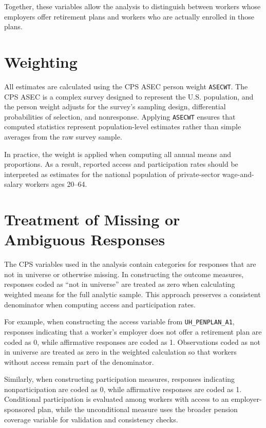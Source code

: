 \documentclass[11pt]{article}
\begin{document}
Together, these variables allow the analysis to distinguish between workers whose employers offer retirement plans and workers who are actually enrolled in those plans.

\section{Weighting}

All estimates are calculated using the CPS ASEC person weight \texttt{ASECWT}. The CPS ASEC is a complex survey designed to represent the U.S. population, and the person weight adjusts for the survey's sampling design, differential probabilities of selection, and nonresponse. Applying \texttt{ASECWT} ensures that computed statistics represent population-level estimates rather than simple averages from the raw survey sample.

In practice, the weight is applied when computing all annual means and proportions. As a result, reported access and participation rates should be interpreted as estimates for the national population of private-sector wage-and-salary workers ages 20--64.

\section{Treatment of Missing or Ambiguous Responses}

The CPS variables used in the analysis contain categories for responses that are not in universe or otherwise missing. In constructing the outcome measures, responses coded as ``not in universe'' are treated as zero when calculating weighted means for the full analytic sample. This approach preserves a consistent denominator when computing access and participation rates.

For example, when constructing the access variable from \texttt{UH\_PENPLAN\_A1}, responses indicating that a worker's employer does not offer a retirement plan are coded as 0, while affirmative responses are coded as 1. Observations coded as not in universe are treated as zero in the weighted calculation so that workers without access remain part of the denominator.

Similarly, when constructing participation measures, responses indicating nonparticipation are coded as 0, while affirmative responses are coded as 1. Conditional participation is evaluated among workers with access to an employer-sponsored plan, while the unconditional measure uses the broader pension coverage variable for validation and consistency checks.
\end{document}
